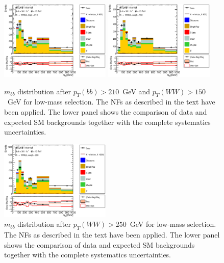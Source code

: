 \begin{figure}[!h]
\begin{center}
\includegraphics*[width=0.47\textwidth] {figures/Unblinded_mbb/C_reOpt500_mww_bbpt210_bbMass_regionA_met25d020.eps}
\includegraphics*[width=0.47\textwidth] {figures/Unblinded_mbb/C_reOpt500_mww_bbpt210_wwpt150_bbMass_regionA_met25d020.eps}
\caption[$m_{bb}$ distribution after $p_{T}(bb) > 210$~GeV and $p_{T}(WW) > 150$~GeV for low-mass selection.]{$m_{bb}$ distribution after $p_{T}(bb) > 210$~GeV and $p_{T}(WW) > 150$~GeV for low-mass selection. The NFs as described in the text have been applied. The lower panel shows the comparison of data and expected SM backgrounds together with the complete systematics uncertainties.}
\end{center}
\end{figure}

\begin{figure}[!h]
\begin{center}
\includegraphics*[width=0.47\textwidth] {figures/Unblinded_mbb/C_reOpt700_mww_bbpt210_wwpt250_bbMass_regionA_met25d020.eps}
\caption[$m_{bb}$ distribution after $p_{T}(WW) > 250$~GeV for low-mass selection.]{$m_{bb}$ distribution after $p_{T}(WW) > 250$~GeV for low-mass selection. The NFs as described in the text have been applied. The lower panel shows the comparison of data and expected SM backgrounds together with the complete systematics uncertainties.}
\end{center}
\end{figure}


